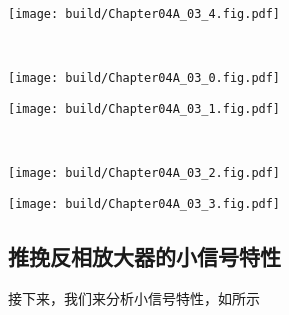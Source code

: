 \newpage
\begin{Figure}[推挽反相放大器的大信号特性]
    \begin{FigureSub}
        \texttt{[image: build/Chapter04A\_03\_4.fig.pdf]}
    \end{FigureSub}\\ \vspace{0.25cm}
    \begin{FigureSub}
        \texttt{[image: build/Chapter04A\_03\_0.fig.pdf]}
    \end{FigureSub}
    \begin{FigureSub}
        \texttt{[image: build/Chapter04A\_03\_1.fig.pdf]}
    \end{FigureSub}\\ \vspace{0.25cm}
    \begin{FigureSub}
        \texttt{[image: build/Chapter04A\_03\_2.fig.pdf]}
    \end{FigureSub}
    \begin{FigureSub}
        \texttt{[image: build/Chapter04A\_03\_3.fig.pdf]}
    \end{FigureSub}
\end{Figure}

\subsection{推挽反相放大器的小信号特性}
接下来，我们来分析小信号特性，如所示

